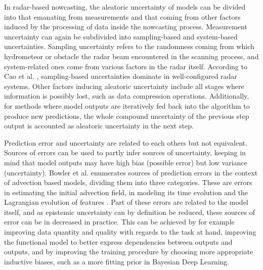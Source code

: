 In radar-based nowcasting, the aleatoric uncertainty of models can be divided into that emanating from measurements and that coming from other factors induced by the processing of data inside the nowcasting process. Measurement uncertainty can again be subdivided into sampling-based and system-based uncertainties. Sampling uncertainty refers to the randomness coming from which hydrometeor or obstacle the radar beam encountered in the scanning process, and system-related ones come from various factors in the radar itself. According to Cao et al. \cite{cao_measurement_2016}, sampling-based uncertainties dominate in well-configured radar systems. Other factors inducing aleatoric uncertainty include all stages where information is possibly lost, such as data compression operations. Additionally, for methods where model outputs are iteratively fed back into the algorithm to produce new predictions, the whole compound uncertainty of the previous step output is accounted as aleatoric uncertainty in the next step. 


Prediction error and uncertainty are related to each others but not equivalent. Sources of errors can be used to partly infer sources of uncertainty, keeping in mind that model outputs may have high bias (possible error) but low variance (uncertainty). Bowler et al. enumerates sources of prediction errors in the context of advection based models, dividing them into three categories. These are errors in estimating the initial advection field, in modeling its time evolution and the Lagrangian evolution of features \cite{bowler_steps_2006}. Part of these errors are related to the model itself, and as epistemic uncertainty can by definition be reduced, these sources of error can be in decreased in practice. This can be achieved by for example improving data quantity and quality with regards to the task at hand, improving the functional model to better express dependencies between outputs and outputs, and by improving the training procedure by choosing more appropriate inductive biases, such as a more fitting prior in Bayesian Deep Learning. 



